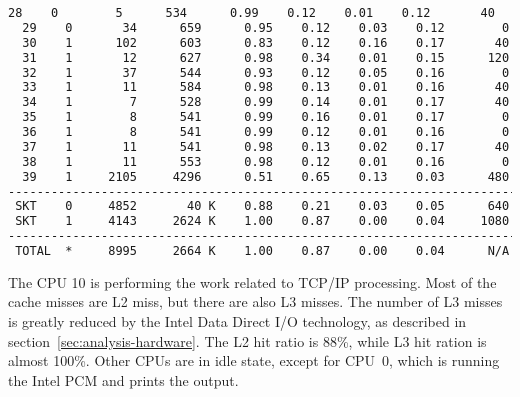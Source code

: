 \begin{lstlisting}[language=TeX]
  28    0        5      534      0.99    0.12    0.01    0.12       40
  29    0       34      659      0.95    0.12    0.03    0.12        0
  30    1      102      603      0.83    0.12    0.16    0.17       40
  31    1       12      627      0.98    0.34    0.01    0.15      120
  32    1       37      544      0.93    0.12    0.05    0.16        0
  33    1       11      584      0.98    0.13    0.01    0.16       40
  34    1        7      528      0.99    0.14    0.01    0.17       40
  35    1        8      541      0.99    0.16    0.01    0.17        0
  36    1        8      541      0.99    0.12    0.01    0.16        0
  37    1       11      541      0.98    0.13    0.02    0.17       40
  38    1       11      553      0.98    0.12    0.01    0.16        0
  39    1     2105     4296      0.51    0.65    0.13    0.03      480
-------------------------------------------------------------------------
 SKT    0     4852       40 K    0.88    0.21    0.03    0.05      640
 SKT    1     4143     2624 K    1.00    0.87    0.00    0.04     1080
-------------------------------------------------------------------------
 TOTAL  *     8995     2664 K    1.00    0.87    0.00    0.04      N/A
\end{lstlisting}
The CPU 10 is performing the work related to TCP/IP processing.
Most of the cache misses are L2 miss, but there are also L3 misses.
The number of L3 misses is greatly reduced by the Intel Data Direct I/O technology,
as described in section~\ref{sec:analysis-hardware}.
The L2 hit ratio is 88\%, while L3 hit ration is almost 100\%.
Other CPUs are in idle state, except for CPU~0, which is running the Intel PCM and prints the output.
